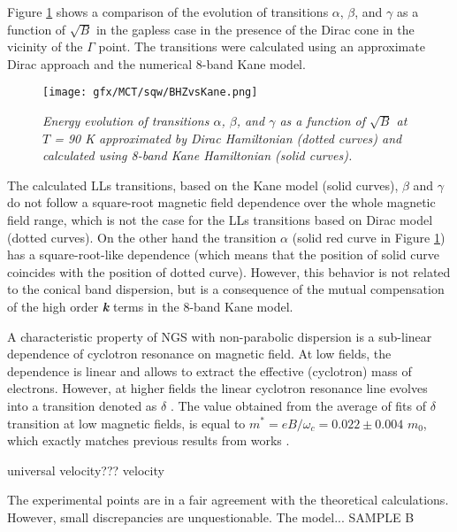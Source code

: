 \documentclass[titlepage,a4paper]{book}
\begin{document}
Figure \ref{fig:BHZvsKane} shows a comparison of the evolution of transitions $\alpha$, $\beta$, and $\gamma$ as a function of $\sqrt{B}$ in the gapless case in the presence of the Dirac cone in the vicinity of the $\Gamma$ point. The transitions were calculated using an approximate Dirac approach and the numerical 8-band Kane model. 
 

\begin{figure}[ht]
	\centering
	\texttt{[image: gfx/MCT/sqw/BHZvsKane.png]}
	\vspace{-10pt}
	\caption{\textit{Energy evolution of transitions $\alpha$, $\beta$, and $\gamma$ as a function of $\sqrt{B}$ at $T$ = 90 K approximated by Dirac Hamiltonian (dotted curves) and calculated using 8-band Kane Hamiltonian (solid curves).}}
	\label{fig:BHZvsKane}
\end{figure}

The calculated LLs transitions, based on the Kane model (solid curves), $\beta$ and $\gamma$ do not follow a square-root magnetic field dependence over the whole magnetic field range, which is not the case for the LLs transitions based on Dirac model (dotted curves). On the other hand the transition $\alpha$ (solid red curve in Figure \ref{fig:BHZvsKane}) has a square-root-like dependence (which means that the position of solid curve coincides with the position of dotted curve). However, this behavior is not related to the conical band dispersion, but is a consequence of the mutual compensation of the high order \textbf{\textit{k}} terms in the 8-band Kane model.

A characteristic property of NGS with non-parabolic dispersion is a sub-linear dependence of cyclotron resonance on magnetic field. At low fields, the dependence is linear and allows to extract the effective (cyclotron) mass of electrons. However, at higher fields the linear cyclotron resonance line evolves into a transition denoted as $\delta$ \cite{Orlita_MCT_QW}. The value obtained from the average of fits of $\delta$ transition at low magnetic fields, is equal to $m^* = eB/\omega_c = 0.022 \pm 0.004$ $m_0$, which exactly matches previous results from works \cite{Orlita_MCT_QW}\cite{Zholudev_MCT_QW}. 

universal velocity???
velocity \cite{Ludwig_MCT_QW}

The experimental points are in a fair agreement with the theoretical calculations. However, small discrepancies are unquestionable. The model...  SAMPLE B

\clearpage
\end{document}
